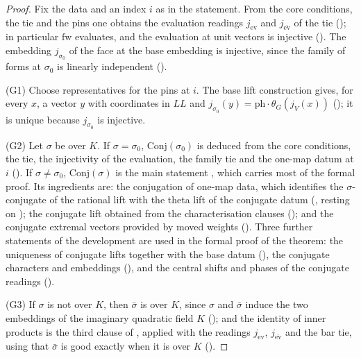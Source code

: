 \begin{proof}
Fix the data and an index $i$ as in the statement. From the core conditions, the tie and the pins one obtains the evaluation
readings $j_{\mathrm{ev}}$ and $j_{\overline{\mathrm{ev}}}$ of the tie (); in
particular $\mathrm{fw}$ evaluates, and the evaluation at unit vectors is injective
(). The embedding $j_{\sigma_0}$ of the face at the base
embedding is injective, since the family of forms at $\sigma_0$ is linearly independent
().

(G1) Choose representatives for the pins at $i$. The base lift construction gives, for every $x$, a vector $y$ with coordinates in
$\mathit{LL}$ and $j_{\sigma_0}(y)=\mathrm{ph}\cdot\theta_G(j_V(x))$ (); it is unique because
$j_{\sigma_0}$ is injective.

(G2) Let $\sigma$ be over $K$. If $\sigma=\sigma_0$, $\mathrm{Conj}(\sigma_0)$ is deduced from the core conditions, the tie, the
injectivity of the evaluation, the family tie and the one-map datum at $i$ (). If
$\sigma\ne\sigma_0$, $\mathrm{Conj}(\sigma)$ is the main statement ,
which carries most of the formal proof. Its ingredients are: the conjugation of one-map data, which identifies the $\sigma$-conjugate
of the rational lift with the theta lift of the conjugate datum (, resting on
); the conjugate lift obtained from the characterisation clauses
(); and the conjugate extremal vectors provided by moved weights
(). Three further statements of the development are used in the formal proof
of the theorem: the uniqueness of conjugate lifts together with the base datum
(), the conjugate characters and embeddings
(), and the central shifts and phases of the conjugate readings
().

(G3) If $\sigma$ is not over $K$, then $\bar\sigma$ is over $K$, since $\sigma$ and $\bar\sigma$ induce the two embeddings of the imaginary
quadratic field $K$ (); and the identity of inner products is the third clause of
, applied with the readings $j_{\mathrm{ev}}$,
$j_{\overline{\mathrm{ev}}}$ and the bar tie, using that $\bar\sigma$ is good exactly when it is over $K$
().
\end{proof}

